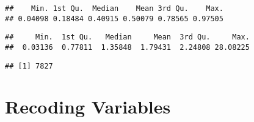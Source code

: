 \documentclass[
]{article}
\newenvironment{Shaded}{\begin{snugshade}}{\end{snugshade}}
\newcommand{\CommentTok}[1]{\textcolor[rgb]{0.56,0.35,0.01}{\textit{#1}}}
\newcommand{\DecValTok}[1]{\textcolor[rgb]{0.00,0.00,0.81}{#1}}
\newcommand{\KeywordTok}[1]{\textcolor[rgb]{0.13,0.29,0.53}{\textbf{#1}}}
\newcommand{\NormalTok}[1]{#1}
\newcommand{\OperatorTok}[1]{\textcolor[rgb]{0.81,0.36,0.00}{\textbf{#1}}}
\newcommand{\StringTok}[1]{\textcolor[rgb]{0.31,0.60,0.02}{#1}}
\begin{document}
\begin{verbatim}
##    Min. 1st Qu.  Median    Mean 3rd Qu.    Max. 
## 0.04098 0.18484 0.40915 0.50079 0.78565 0.97505
\end{verbatim}

\begin{Shaded}
\end{Shaded}

\begin{verbatim}
##     Min.  1st Qu.   Median     Mean  3rd Qu.     Max. 
##  0.03136  0.77811  1.35848  1.79431  2.24808 28.08225
\end{verbatim}

\begin{Shaded}
\end{Shaded}

\begin{verbatim}
## [1] 7827
\end{verbatim}

\hypertarget{recoding-variables}{%
\section{Recoding Variables}\label{recoding-variables}}
\end{document}
